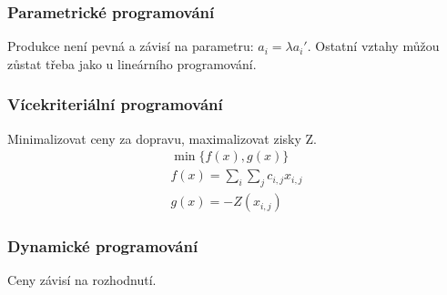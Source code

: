 \documentclass[a4paper,12pt,titlepage]{article}
\begin{document}
\subsubsection{Parametrické programování}
Produkce není pevná a závisí na parametru: $a_i = \lambda a_i'$. Ostatní vztahy
můžou zůstat třeba jako u lineárního programování.
\subsubsection{Vícekriteriální programování}
Minimalizovat ceny za dopravu, maximalizovat zisky Z.
\begin{align}
	\min \{f(x), g(x)\} \\
	f(x) = \sum_i \sum_j c_{i,j} x_{i,j} \\
	g(x) = - Z(x_{i,j}) 
\end{align}
\subsubsection{Dynamické programování}
Ceny závisí na rozhodnutí.
\end{document}
